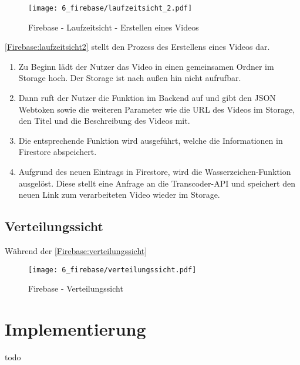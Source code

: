 \begin{figure}
  \centering
  \texttt{[image: 6\_firebase/laufzeitsicht\_2.pdf]}
  \caption{Firebase - Laufzeitsicht - Erstellen eines Videos}
  \label{Firebase:laufzeitsicht2}
\end{figure}

\autoref{Firebase:laufzeitsicht2} stellt den Prozess des Erstellens eines Videos dar.
\begin{enumerate}
  \item{Zu Beginn lädt der Nutzer das Video in einen gemeinsamen Ordner im Storage hoch. Der Storage ist nach außen hin nicht aufrufbar.}
  \item{Dann ruft der Nutzer die Funktion im Backend auf und gibt den JSON Webtoken sowie die weiteren Parameter wie die URL des Videos im Storage, den Titel und die Beschreibung des Videos mit.}
  \item{Die entsprechende Funktion wird ausgeführt, welche die Informationen in Firestore abspeichert.}
  \item{Aufgrund des neuen Eintrags in Firestore, wird die Wasserzeichen-Funktion ausgelöst. Diese stellt eine Anfrage an die Transcoder-API und speichert den neuen Link zum verarbeiteten Video wieder im Storage.}
\end{enumerate}

\subsection{Verteilungssicht}

Während der \autoref{Firebase:verteilungssicht}

\begin{figure}
  \centering
  \texttt{[image: 6\_firebase/verteilungssicht.pdf]}
  \caption{Firebase - Verteilungssicht}
  \label{Firebase:verteilungssicht}
\end{figure}

\section{Implementierung}

todo